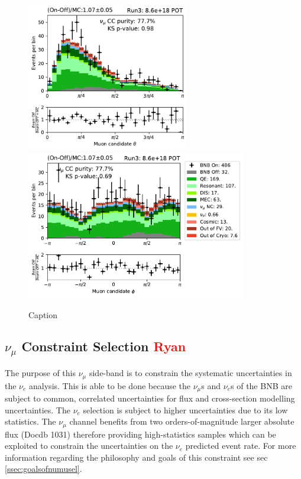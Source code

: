 \begin{figure}[H]
    \centering
    \includegraphics[height=6.5cm]{NuMuCCsel/Images/run3/numu_theta_run3.pdf} \hspace{2mm}
    \includegraphics[height=6.5cm]{NuMuCCsel/Images/run3/numu_phi_run3.pdf}
    \caption{Caption}
    \label{fig:numu_angles}
\end{figure}

\subsection{$\nu_{\mu}$ Constraint Selection \textcolor{red}{Ryan}}
\label{ssec:NuMUCCsel:constr}
\par The purpose of this $\nu_{\mu}$ side-band is to constrain the systematic uncertainties in the $\nu_{e}$ analysis. This is able to be done because the $\nu_{\mu}$s and $\nu_{e}$s of the BNB are subject to common, correlated uncertainties for flux and cross-section modelling uncertainties. The $\nu_{e}$ selection is subject to higher uncertainties due to its low statistics. The $\nu_{\mu}$ channel benefits from two orders-of-magnitude larger absolute flux (Docdb 1031) therefore providing high-statistics samples which can be exploited to constrain the uncertainties on the $\nu_{e}$ predicted event rate. For more information regarding the philosophy and goals of this constraint see sec \ref{ssec:goalsofnumusel}.

